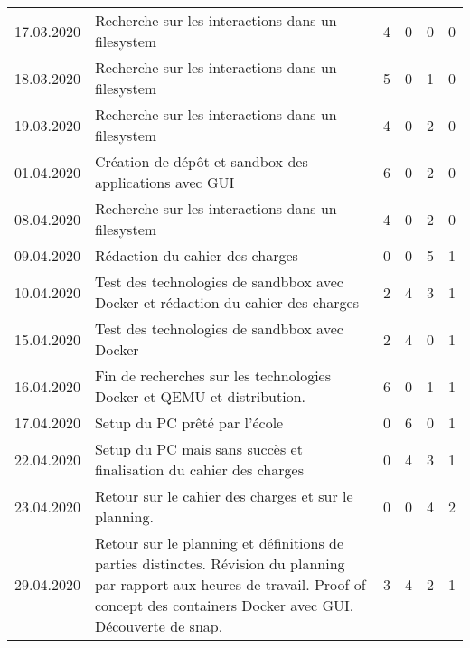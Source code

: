 \begin{landscape}
\begin{longtable}[c]{lp{10cm}rrrr}
	17.03.2020 
	& Recherche sur les interactions dans un filesystem
	& 4 %
	& 0 %
	& 0 %
	& 0\\ %
	
	18.03.2020 
	& Recherche sur les interactions dans un filesystem
	& 5 %
	& 0 %
	& 1 %
	& 0\\ %
	
	19.03.2020 
	& Recherche sur les interactions dans un filesystem
	& 4 %
	& 0 %
	& 2 %
	& 0\\ %
	
	01.04.2020 
	& Création de dépôt et sandbox des applications avec GUI
	& 6 %
	& 0 %
	& 2 %
	& 0\\ %
	
	
	08.04.2020 
	& Recherche sur les interactions dans un filesystem
	& 4 %
	& 0 %
	& 2 %
	& 0\\ %
	
	09.04.2020 
	& Rédaction du cahier des charges
	& 0 %
	& 0 %
	& 5 %
	& 1\\ %
	
	10.04.2020 
	& Test des technologies de sandbbox avec Docker et rédaction du cahier des charges
	& 2 %
	& 4 %
	& 3 %
	& 1\\ %
	
	15.04.2020 
	& Test des technologies de sandbbox avec Docker
	& 2 %
	& 4 %
	& 0 %
	& 1\\ %
	
	16.04.2020
	& Fin de recherches sur les technologies Docker et QEMU et distribution.
	& 6 %
	& 0 %
	& 1 %
	& 1\\ %
	
	17.04.2020 
	& Setup du PC prêté par l'école
	& 0 %
	& 6 %
	& 0 %
	& 1\\ %
	
	22.04.2020
	& Setup du PC mais sans succès et finalisation du cahier des charges
	& 0 %
	& 4 %
	& 3 %
	& 1\\ %
	
	23.04.2020
	& Retour sur le cahier des charges et sur le planning.
	& 0 %
	& 0 %
	& 4 %
	& 2\\ %
	
	29.04.2020
	& Retour sur le planning et définitions de parties distinctes. Révision du planning par rapport aux heures de travail. Proof of concept des containers Docker avec GUI. Découverte de snap.
	& 3 %
	& 4 %
	& 2 %
	& 1\\ %
	

\end{longtable}
\end{landscape}

